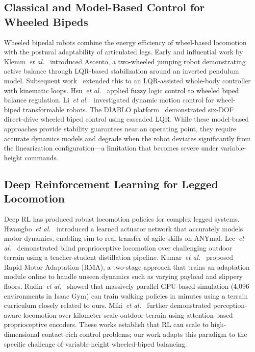 \documentclass[conference]{IEEEtran}
\begin{document}
\subsection{Classical and Model-Based Control for Wheeled Bipeds}
Wheeled bipedal robots combine the energy efficiency of wheel-based locomotion
with the postural adaptability of articulated legs.
Early and influential work by Klemm~\emph{et al.}~\cite{klemm2019ascento}
introduced Ascento, a two-wheeled jumping robot demonstrating active balance
through LQR-based stabilization around an inverted pendulum model.
Subsequent work~\cite{klemm2020lqrwbc} extended this to an LQR-assisted
whole-body controller with kinematic loops.
Hsu~\emph{et al.}~\cite{hsu2022wbrfuzzy} applied fuzzy logic control to
wheeled biped balance regulation.
Li~\emph{et al.}~\cite{li2021wheelbiped} investigated dynamic motion control
for wheel-biped transformable robots.
The DIABLO platform~\cite{diablo2024} demonstrated six-DOF direct-drive
wheeled biped control using cascaded LQR.
While these model-based approaches provide stability guarantees near an
operating point, they require accurate dynamics models and degrade when the
robot deviates significantly from the linearization configuration---a
limitation that becomes severe under variable-height commands.

\subsection{Deep Reinforcement Learning for Legged Locomotion}
Deep RL has produced robust locomotion policies for complex legged systems.
Hwangbo~\emph{et al.}~\cite{hwangbo2019learning} introduced a learned
actuator network that accurately models motor dynamics, enabling sim-to-real
transfer of agile skills on ANYmal.
Lee~\emph{et al.}~\cite{lee2020learning} demonstrated blind proprioceptive
locomotion over challenging outdoor terrain using a teacher-student
distillation pipeline.
Kumar~\emph{et al.}~\cite{kumar2021rma} proposed Rapid Motor Adaptation (RMA),
a two-stage approach that trains an adaptation module online to handle
unseen dynamics such as varying payload and slippery floors.
Rudin~\emph{et al.}~\cite{rudin2022walk} showed that massively parallel
GPU-based simulation (4,096 environments in Isaac Gym) can train walking
policies in minutes using a terrain curriculum closely related to ours.
Miki~\emph{et al.}~\cite{miki2022wild} further demonstrated perception-aware
locomotion over kilometer-scale outdoor terrain using attention-based
proprioceptive encoders.
These works establish that RL can scale to high-dimensional contact-rich
control problems; our work adapts this paradigm to the specific challenge of
variable-height wheeled-biped balancing.
\end{document}
